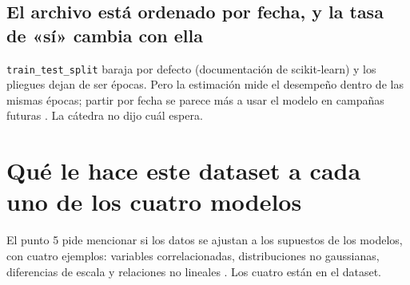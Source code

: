 \documentclass[10pt,a4paper]{article}
\begin{document}
\subsection{El archivo está ordenado por fecha, y la tasa de «sí» cambia con ella}

\noindent\begin{minipage}[t]{0.3\linewidth}\vspace{0pt}
\end{minipage}\hfill
\begin{minipage}[t]{0.66\linewidth}\vspace{6pt}
\texttt{train\_test\_split} baraja por defecto (documentación de scikit-learn) y los pliegues dejan
de ser épocas. Pero la estimación mide el desempeño dentro de las mismas épocas; partir por fecha se
parece más a usar el modelo en campañas futuras . La cátedra no dijo cuál espera.
\end{minipage}

\newpage
\section{Qué le hace este dataset a cada uno de los cuatro modelos}\label{sec:modelos}

El punto 5 pide mencionar si los datos se ajustan a los supuestos de los modelos, con cuatro
ejemplos: variables correlacionadas, distribuciones no gaussianas, diferencias de escala y relaciones
no lineales . Los cuatro están en el dataset.

\noindent\begin{minipage}[t]{0.58\linewidth}\vspace{0pt}
\end{minipage}\hfill
\begin{minipage}[t]{0.39\linewidth}\vspace{0pt}
\medskip
{}
\end{minipage}
\end{document}
